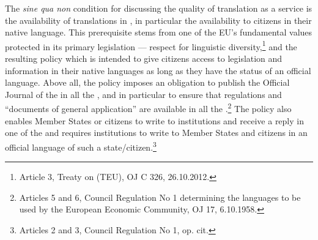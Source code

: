 \documentclass[output=paper]{langsci/langscibook}
\begin{document}
The \textit{sine qua non} condition for discussing the quality of translation as a service is the availability of translations in , in particular the availability to  citizens in their native language. This prerequisite stems from one of the EU's fundamental values protected in its primary legislation — respect for linguistic diversity,\footnote{Article 3, Treaty on  (TEU), OJ C 326, 26.10.2012.} and the resulting  policy which is intended to give citizens access to  legislation and information in their native languages as long as they have the status of an official language. Above all, the  policy imposes an obligation to publish the Official Journal of the  in all the , and in particular to ensure that regulations and “documents of general application” are available in all the .\footnote{Articles 5 and 6, Council Regulation No 1 determining the languages to be used by the European Economic Community, OJ 17, 6.10.1958.} The  policy also enables Member States or citizens to write to  institutions and receive a reply in one of the  and requires  institutions to write to Member States and citizens in an official language of such a state/citizen.\footnote{Articles 2 and 3, Council Regulation No 1, op. cit.}
\end{document}
